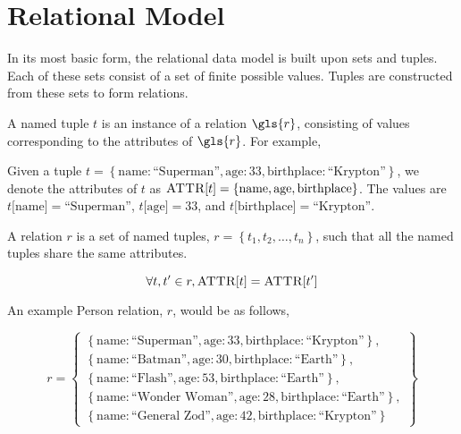 \section{Relational Model}
	In its most basic form, the relational data model is built upon sets and tuples.  Each of these sets consist of a set of finite possible values.  Tuples are constructed from these sets to form relations.
	
	\begin{defn}
	\label{def:named-tuple}
		A named tuple $t$ is an instance of a relation $\gls{r}$, consisting of values corresponding to the attributes of $\gls{r}$.  For example,
	\end{defn}
	
	\begin{ex}
		Given a tuple $t = \left\{\mathrm{name}: \textrm{``Superman''}, \mathrm{age}: 33, \mathrm{birthplace}: \textrm{``Krypton''}\right\}$, we denote the attributes of $t$ as $\textsc{ATTR}\lbrack t\rbrack = \left\{\mathrm{name}, \mathrm{age}, \mathrm{birthplace}\right\}$.  The values are $t\lbrack \mathrm{name}\rbrack = \textrm{``Superman''}$, $t\lbrack \mathrm{age}\rbrack = 33$, and $t\lbrack \mathrm{birthplace}\rbrack = \textrm{``Krypton''}$.
	\end{ex}
	
	\begin{defn}[Relation]
	\label{def:relation}
		A relation $r$ is a set of named tuples, $r = \left\{t_1, t_2, \dotsc, t_n\right\}$, such that all the named tuples share the same attributes.
		
		$$\forall t, t' \in r, \textsc{ATTR}\lbrack t\rbrack = \textsc{ATTR}\lbrack t'\rbrack$$
	\end{defn}
	
	\begin{ex}
		An example Person relation, $r$, would be as follows,
		
		$$r = \left\{
			\begin{array}{l}
				\left\{\mathrm{name}: \textrm{``Superman''}, \mathrm{age}: 33, \mathrm{birthplace}: \textrm{``Krypton''}\right\}, \\
				\left\{\mathrm{name}: \textrm{``Batman''}, \mathrm{age}: 30, \mathrm{birthplace}: \textrm{``Earth''}\right\}, \\
				\left\{\mathrm{name}: \textrm{``Flash''}, \mathrm{age}: 53, \mathrm{birthplace}: \textrm{``Earth''}\right\}, \\
				\left\{\mathrm{name}: \textrm{``Wonder Woman''}, \mathrm{age}: 28, \mathrm{birthplace}: \textrm{``Earth''}\right\}, \\
				\left\{\mathrm{name}: \textrm{``General Zod''}, \mathrm{age}: 42, \mathrm{birthplace}: \textrm{``Krypton''}\right\}
			\end{array}
		\right\}$$
	\end{ex}
		
